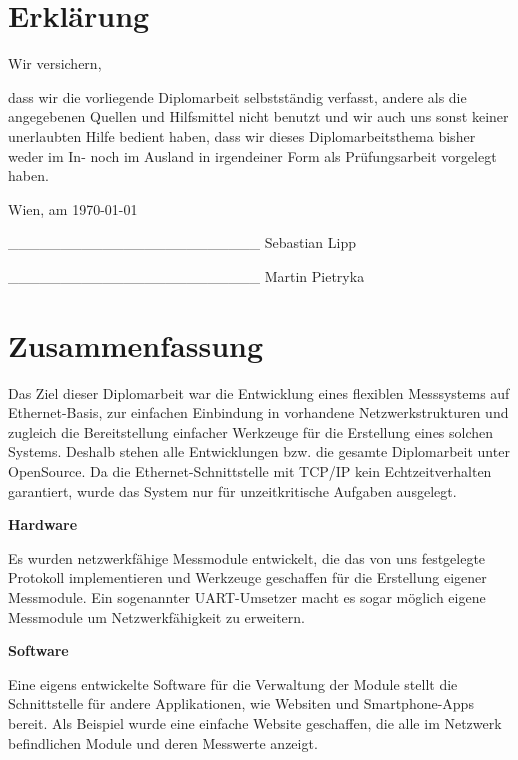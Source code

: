 \documentclass[a4paper,14pt,headsepline]{scrartcl}
\begin{document}
\newpage

\onehalfspacing

\section*{Erklärung}
Wir versichern,

dass wir die vorliegende Diplomarbeit selbstständig verfasst, andere als die angegebenen Quellen und Hilfsmittel nicht benutzt und wir auch uns sonst keiner unerlaubten Hilfe bedient haben, dass wir dieses Diplomarbeitsthema bisher weder im In- noch im Ausland in irgendeiner Form als Prüfungsarbeit vorgelegt haben. 

Wien, am \today

\_\_\_\_\_\_\_\_\_\_\_\_\_\_\_\_\_\_\_\_\_\_\_\_   \newline Sebastian Lipp 

\_\_\_\_\_\_\_\_\_\_\_\_\_\_\_\_\_\_\_\_\_\_\_\_   \newline Martin Pietryka

\newpage

\section*{Zusammenfassung}
Das Ziel dieser Diplomarbeit war die Entwicklung eines flexiblen Messsystems auf Ethernet-Basis, zur einfachen Einbindung in vorhandene Netzwerkstrukturen und zugleich die Bereitstellung einfacher Werkzeuge für die Erstellung eines solchen Systems. Deshalb stehen alle Entwicklungen bzw. die gesamte Diplomarbeit unter OpenSource. Da die Ethernet-Schnittstelle mit TCP/IP kein Echtzeitverhalten garantiert, wurde das System nur für unzeitkritische Aufgaben ausgelegt. 

\textbf{Hardware}

Es wurden netzwerkfähige Messmodule entwickelt, die das von uns festgelegte Protokoll implementieren und Werkzeuge geschaffen für die Erstellung eigener Messmodule. Ein sogenannter UART-Umsetzer macht es sogar möglich eigene Messmodule um Netzwerkfähigkeit zu erweitern. 

\textbf{Software}

Eine eigens entwickelte Software für die Verwaltung der Module stellt die Schnittstelle für andere Applikationen, wie Websiten und Smartphone-Apps bereit. Als Beispiel wurde eine einfache Website geschaffen, die alle im Netzwerk befindlichen Module und deren Messwerte anzeigt. 

\newpage
\end{document}
